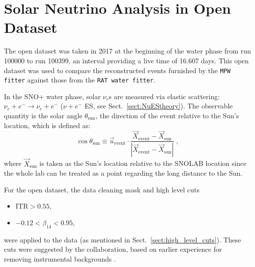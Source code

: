 \section{Solar Neutrino Analysis in Open Dataset}

The open dataset was taken in 2017 at the beginning of the water phase from run 100000 to run 100399, an interval providing a live time of 16.607 days.
This open dataset was used to compare the reconstructed events furnished by the \texttt{MPW fitter} against those from the \texttt{RAT water fitter}.

In the SNO+ water phase, solar $\nu_e$s are measured via elastic scattering: $\nu_e+e^-\to \nu_e+e^-$ ($\nu+e^-$ ES, see Sect.~\ref{sect:NuEStheory}). The observable quantity is the solar angle $\theta_\mathrm{sun}$, the direction of the event relative to the Sun's location, which is defined as:
\begin{equation}
\cos\theta_\mathrm{sun}\equiv \vec u_\mathrm{event}\cdot \frac{\vec{X}_\mathrm{event}-\vec{X}_\mathrm{sun}}{|\vec{X}_\mathrm{event}-\vec{X}_\mathrm{sun}|}\;,
\end{equation}
where $\vec{X}_\mathrm{sun}$ is taken as the Sun's location relative to the SNOLAB location since the whole lab can be treated as a point regarding the long distance to the Sun. 

For the open dataset, the data cleaning mask and high level cuts
\begin{itemize}
    \item $\mathrm{ITR}>0.55$\;,
    \item $-0.12<\beta_{14}<0.95$\;,
\end{itemize}
were applied to the data (as mentioned in Sect.~\ref{sect:high_level_cuts}). These cuts were suggested by the collaboration, based on earlier experience for removing instrumental backgrounds \cite{waterunidoc}. 

